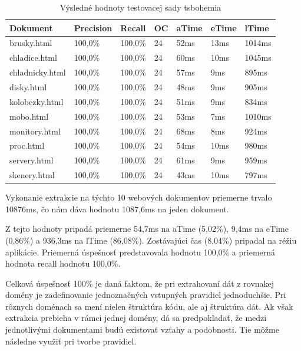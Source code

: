 \begin{table}[hbt]
\caption{Výsledné hodnoty testovacej sady tsbohemia}
\centering
\begin{tabular}{|l|l|l|l|l|l|l|}
\hline
\textbf{Dokument}          & \textbf{Precision} & \textbf{Recall}  & \textbf{OC}  & \textbf{aTime} & \textbf{eTime} & \textbf{lTime}  \\ \hline
brusky.html     & 100,0\%   & 100,0\% & 24 & 52ms  & 13ms  & 1014ms \\ \hline
chladice.html   & 100,0\%   & 100,0\% & 24 & 60ms  & 10ms  & 1045ms \\ \hline
chladnicky.html & 100,0\%   & 100,0\% & 24 & 57ms  & 9ms   & 895ms  \\ \hline
disky.html      & 100,0\%   & 100,0\% & 24 & 48ms  & 9ms   & 905ms  \\ \hline
kolobezky.html  & 100,0\%   & 100,0\% & 24 & 51ms  & 9ms   & 834ms  \\ \hline
mobo.html       & 100,0\%   & 100,0\% & 24 & 53ms  & 7ms   & 1010ms \\ \hline
monitory.html   & 100,0\%   & 100,0\% & 24 & 68ms  & 8ms   & 924ms  \\ \hline
proc.html       & 100,0\%   & 100,0\% & 24 & 54ms  & 10ms  & 980ms  \\ \hline
servery.html    & 100,0\%   & 100,0\% & 24 & 61ms  & 9ms   & 959ms  \\ \hline
skenery.html    & 100,0\%   & 100,0\% & 24 & 43ms  & 10ms  & 797ms  \\ \hline
\end{tabular}
\end{table}

Vykonanie extrakcie na týchto 10 webových dokumentov priemerne trvalo 10876ms, čo nám dáva hodnotu 1087,6ms na jeden dokument. 

Z tejto hodnoty pripadá priemerne 54,7ms na aTime (5,02\%), 9,4ms na eTime (0,86\%) a 936,3ms na lTime (86,08\%). Zostávajúci čas (8,04\%) pripadal na réžiu aplikácie. Priemerná úspešnosť predstavovala hodnotu 100,0\% a priemerná hodnota recall hodnotu 100,0\%. 

\bigskip

Celková úspešnosť 100\% je daná faktom, že pri extrahovaní dát z rovnakej domény je zadefinovanie jednoznačných vstupných pravidiel jednoduchšie. Pri rôznych doménach sa mení nielen štruktúra kódu, ale aj štruktúra dát. Ak však extrakcia prebieha v rámci jednej domény, dá sa predpokladať, že medzi jednotlivými dokumentami budú existovať vzťahy a podobnosti. Tie môžme následne využiť pri tvorbe pravidiel.

